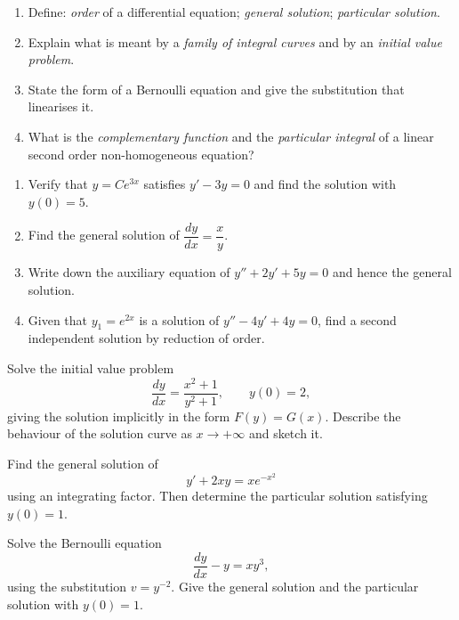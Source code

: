 \documentclass[11pt]{article}
\newcounter{popsec}
\newcounter{popsub}
\newcommand{\courssub}[1]{%
  \stepcounter{popsub}%
  \par\vspace{9pt}\noindent{\popxbold\fontsize{11.5}{13}\selectfont\color{popink}{\color{poporange}\thepopsec.\thepopsub}\hspace{6pt}#1}\par\nopagebreak\vspace{4pt}
}
\begin{document}
\begin{exercice}
\begin{enumerate}
\item Define: \emph{order} of a differential equation; \emph{general solution}; \emph{particular solution}.
\item Explain what is meant by a \emph{family of integral curves} and by an \emph{initial value problem}.
\item State the form of a Bernoulli equation and give the substitution that linearises it.
\item What is the \emph{complementary function} and the \emph{particular integral} of a linear second order non-homogeneous equation?
\end{enumerate}
\end{exercice}

\begin{exercice}
\begin{enumerate}
\item Verify that $y = Ce^{3x}$ satisfies $y' - 3y = 0$ and find the solution with $y(0) = 5$.
\item Find the general solution of $\dfrac{dy}{dx} = \dfrac{x}{y}$.
\item Write down the auxiliary equation of $y'' + 2y' + 5y = 0$ and hence the general solution.
\item Given that $y_1 = e^{2x}$ is a solution of $y'' - 4y' + 4y = 0$, find a second independent solution by reduction of order.
\end{enumerate}
\end{exercice}

\courssub{I practise}

\begin{exercice}
Solve the initial value problem
\[ \frac{dy}{dx} = \frac{x^2 + 1}{y^2 + 1}, \qquad y(0) = 2, \]
giving the solution implicitly in the form $F(y) = G(x)$. Describe the behaviour of the solution curve as $x \to +\infty$ and sketch it.
\end{exercice}

\begin{exercice}
Find the general solution of
\[ y' + 2xy = xe^{-x^2} \]
using an integrating factor. Then determine the particular solution satisfying $y(0) = 1$.
\end{exercice}

\begin{exercice}
Solve the Bernoulli equation
\[ \frac{dy}{dx} - y = xy^3, \]
using the substitution $v = y^{-2}$. Give the general solution and the particular solution with $y(0) = 1$.
\end{exercice}
\end{document}
